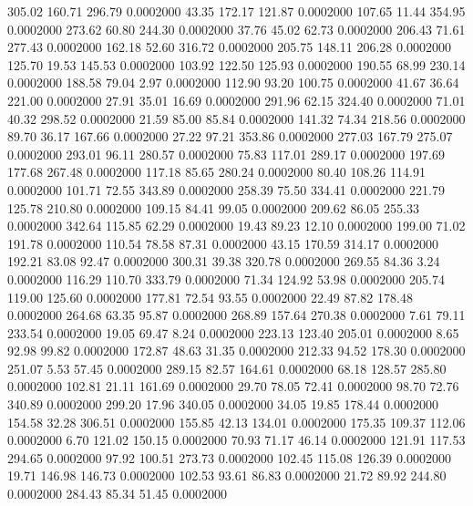  305.02  160.71  296.79   0.0002000
  43.35  172.17  121.87   0.0002000
 107.65   11.44  354.95   0.0002000
 273.62   60.80  244.30   0.0002000
  37.76   45.02   62.73   0.0002000
 206.43   71.61  277.43   0.0002000
 162.18   52.60  316.72   0.0002000
 205.75  148.11  206.28   0.0002000
 125.70   19.53  145.53   0.0002000
 103.92  122.50  125.93   0.0002000
 190.55   68.99  230.14   0.0002000
 188.58   79.04    2.97   0.0002000
 112.90   93.20  100.75   0.0002000
  41.67   36.64  221.00   0.0002000
  27.91   35.01   16.69   0.0002000
 291.96   62.15  324.40   0.0002000
  71.01   40.32  298.52   0.0002000
  21.59   85.00   85.84   0.0002000
 141.32   74.34  218.56   0.0002000
  89.70   36.17  167.66   0.0002000
  27.22   97.21  353.86   0.0002000
 277.03  167.79  275.07   0.0002000
 293.01   96.11  280.57   0.0002000
  75.83  117.01  289.17   0.0002000
 197.69  177.68  267.48   0.0002000
 117.18   85.65  280.24   0.0002000
  80.40  108.26  114.91   0.0002000
 101.71   72.55  343.89   0.0002000
 258.39   75.50  334.41   0.0002000
 221.79  125.78  210.80   0.0002000
 109.15   84.41   99.05   0.0002000
 209.62   86.05  255.33   0.0002000
 342.64  115.85   62.29   0.0002000
  19.43   89.23   12.10   0.0002000
 199.00   71.02  191.78   0.0002000
 110.54   78.58   87.31   0.0002000
  43.15  170.59  314.17   0.0002000
 192.21   83.08   92.47   0.0002000
 300.31   39.38  320.78   0.0002000
 269.55   84.36    3.24   0.0002000
 116.29  110.70  333.79   0.0002000
  71.34  124.92   53.98   0.0002000
 205.74  119.00  125.60   0.0002000
 177.81   72.54   93.55   0.0002000
  22.49   87.82  178.48   0.0002000
 264.68   63.35   95.87   0.0002000
 268.89  157.64  270.38   0.0002000
   7.61   79.11  233.54   0.0002000
  19.05   69.47    8.24   0.0002000
 223.13  123.40  205.01   0.0002000
   8.65   92.98   99.82   0.0002000
 172.87   48.63   31.35   0.0002000
 212.33   94.52  178.30   0.0002000
 251.07    5.53   57.45   0.0002000
 289.15   82.57  164.61   0.0002000
  68.18  128.57  285.80   0.0002000
 102.81   21.11  161.69   0.0002000
  29.70   78.05   72.41   0.0002000
  98.70   72.76  340.89   0.0002000
 299.20   17.96  340.05   0.0002000
  34.05   19.85  178.44   0.0002000
 154.58   32.28  306.51   0.0002000
 155.85   42.13  134.01   0.0002000
 175.35  109.37  112.06   0.0002000
   6.70  121.02  150.15   0.0002000
  70.93   71.17   46.14   0.0002000
 121.91  117.53  294.65   0.0002000
  97.92  100.51  273.73   0.0002000
 102.45  115.08  126.39   0.0002000
  19.71  146.98  146.73   0.0002000
 102.53   93.61   86.83   0.0002000
  21.72   89.92  244.80   0.0002000
 284.43   85.34   51.45   0.0002000

